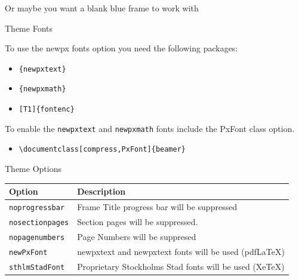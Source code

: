 \documentclass[newPxFont]{beamer}
\begin{document}
\begingroup
{}
\begin{frame}

Or maybe you want a blank blue frame to work with


\end{frame}
\endgroup


\begin{frame}[containsverbatim]{Theme Fonts}

To use the newpx fonts option you need the following packages:

\begin{itemize}
	\item \verb|{newpxtext}|
	\item \verb|{newpxmath}|
	\item \verb|[T1]{fontenc}|
\end{itemize}

To enable the \verb|newpxtext| and \verb|newpxmath| fonts include the \alert{PxFont} class option.\\

\begin{itemize}
	\item \verb|\documentclass[compress,PxFont]{beamer}|
\end{itemize}

\end{frame}


\begin{frame}{Theme Options}
\begin{table}[]
	\begin{tabularx}{\linewidth}{l>{\raggedright}X}
		\toprule
		\textbf{Option}			& \textbf{Description} \tabularnewline
		\midrule
		\texttt{noprogressbar} & Frame Title progress bar will be suppressed \tabularnewline
		\texttt{nosectionpages} & Section pages will be suppressed.\tabularnewline
		\texttt{nopagenumbers} & Page Numbers will be suppresed \tabularnewline
		\texttt{newPxFont} & newpxtext and newpxtext fonts will be used (pdfLaTeX) \tabularnewline
		\texttt{sthlmStadFont} & Proprietary Stockholms Stad fonts will be used (XeTeX) \tabularnewline
		\bottomrule
	\end{tabularx}
	\label{tab:options}
\end{table}
\end{frame}
\end{document}
